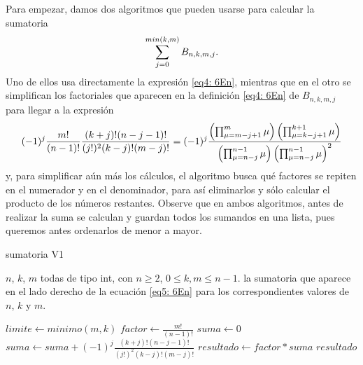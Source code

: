 Para empezar, damos dos algoritmos que pueden
usarse para calcular la sumatoria 
\[
\sum\limits_{j=0}^{min(k,m)}B_{n,k,m,j}.
\] 
Uno de ellos usa
directamente la expresión \eqref{eq4: 6En}, mientras
que en el otro se simplifican los factoriales que
aparecen en la definición \eqref{eq4: 6En}
de $B_{n,k,m,j}$
para llegar a la expresión
\[
(-1)^{j}
\frac{m!}{(n-1)!}
 \frac{(k+j)!(n-j-1)!}{(j!)^{2}(k-j)!(m-j)!}
= (-1)^{j}
\frac{\left( \prod_{\mu=m-j+1}^{m}{\mu} \right)
\left( \prod_{\mu=k-j+1}^{k+1}{\mu} \right)
}{
\left( \prod_{\mu=n-j}^{n-1}{\mu} \right)
\left( \prod_{\mu=n-j}^{n-1}{\mu} \right)^{2}
}
\]
y, para simplificar aún más los cálculos, el algoritmo
busca qué factores se repiten en el numerador y en el denominador,
para así eliminarlos y sólo calcular el producto de los 
números restantes. Observe que en ambos algoritmos, antes
de realizar la suma se calculan y guardan todos los sumandos
en una lista, pues queremos antes ordenarlos de menor a mayor.


\begin{algorithm}
\caption{sumatoria V1}
\begin{algorithmic}[1] 
\REQUIRE $n$, $k$, $m$ todas de tipo int, con $n \geq 2$, 
$0 \leq k, m \leq n-1$.
\ENSURE la sumatoria que aparece en el lado derecho de la
ecuación \eqref{eq5: 6En}
para los correspondientes valores de $n$, $k$ y $m$.

\STATE $limite \leftarrow minimo(m,k)$
\STATE $factor \leftarrow \frac{m!}{(n-1)!}$
\STATE $suma \leftarrow 0$
\STATE $suma \leftarrow suma + 
(-1)^{j} \frac{(k+j)!(n-j-1)!}{(j!)^{2}(k-j)!(m-j)!}$
\ENDFOR
\STATE $resultado \leftarrow factor*suma$
\RETURN $resultado$
\end{algorithmic}
\end{algorithm}


